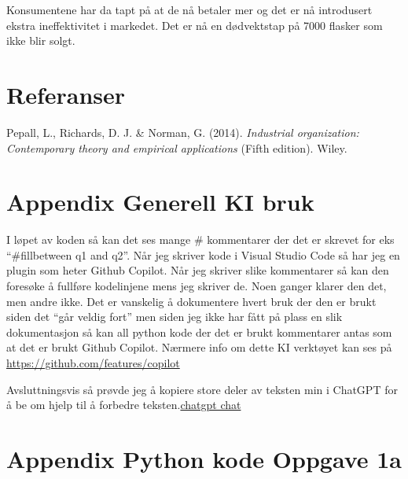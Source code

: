 \documentclass[
  12pt,
  a4paper,
  DIV=11,
  numbers=noendperiod]{scrartcl}
\newlength{\cslhangindent}
\newenvironment{CSLReferences}[2] %
 {\begin{list}{}{%
  \setlength{\itemindent}{0pt}
  \setlength{\leftmargin}{0pt}
  \setlength{\parsep}{0pt}
  \ifodd #1
   \setlength{\leftmargin}{\cslhangindent}
   \setlength{\itemindent}{-1\cslhangindent}
  \fi
  \setlength{\itemsep}{#2\baselineskip}}}
 {\end{list}}
\begin{document}
Konsumentene har da tapt på at de nå betaler mer og det er nå
introdusert ekstra ineffektivitet i markedet. Det er nå en dødvektstap
på 7000 flasker som ikke blir solgt.

\clearpage

\section{Referanser}\label{referanser}

\label{refs}
\begin{CSLReferences}{1}{0}
Pepall, L., Richards, D. J. \& Norman, G. (2014). \emph{Industrial
organization: Contemporary theory and empirical applications} (Fifth
edition). Wiley.

\end{CSLReferences}

\hfill\break

\hfill\break

\hfill\break

\hfill\break

\appendix

\section {Appendix Generell KI bruk}

I løpet av koden så kan det ses mange \# kommentarer der det er skrevet
for eks ``\#fillbetween q1 and q2''. Når jeg skriver kode i Visual
Studio Code så har jeg en plugin som heter Github Copilot. Når jeg
skriver slike kommentarer så kan den foresøke å fullføre kodelinjene
mens jeg skriver de. Noen ganger klarer den det, men andre ikke. Det er
vanskelig å dokumentere hvert bruk der den er brukt siden det ``går
veldig fort'' men siden jeg ikke har fått på plass en slik dokumentasjon
så kan all python kode der det er brukt kommentarer antas som at det er
brukt Github Copilot. Nærmere info om dette KI verktøyet kan ses på
\url{https://github.com/features/copilot}

Avsluttningsvis så prøvde jeg å kopiere store deler av teksten min i
ChatGPT for å be om hjelp til å forbedre
teksten.\href{https://chat.openai.com/share/a72be4bd-cbbc-4e7c-82d5-dc9c5241b74b}{chatgpt
chat}

\clearpage

\section {Appendix Python kode Oppgave 1a}
\end{document}
